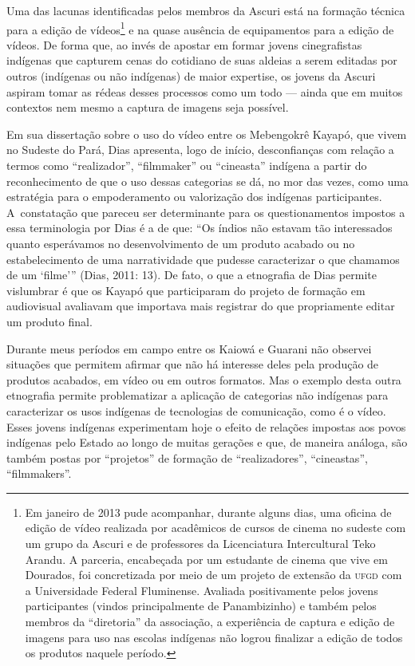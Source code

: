 Uma das lacunas identificadas pelos membros da Ascuri está na formação
técnica para a edição de vídeos\footnote[12]{Em janeiro de 2013 pude
acompanhar, durante alguns dias, uma oficina de edição de vídeo
realizada por acadêmicos de cursos de cinema no sudeste com um grupo da
Ascuri e de professores da Licenciatura Intercultural Teko Arandu. A
parceria, encabeçada por um estudante de cinema que vive em Dourados,
foi concretizada por meio de um projeto de extensão da \textsc{ufgd} com a
Universidade Federal Fluminense. Avaliada positivamente pelos jovens
participantes (vindos principalmente de Panambizinho) e também pelos
membros da ``diretoria'' da associação, a experiência de captura e edição
de imagens para uso nas escolas indígenas não logrou finalizar a edição
de todos os produtos naquele período. } e na quase ausência de
equipamentos para a edição de vídeos. De forma que, ao invés de apostar
em formar jovens cinegrafistas indígenas que capturem cenas do
cotidiano de suas aldeias a serem editadas por outros (indígenas ou não
indígenas) de maior expertise, os jovens da Ascuri aspiram tomar as
rédeas desses processos como um todo --- ainda que em muitos contextos
nem mesmo a captura de imagens seja possível.

Em sua dissertação sobre o uso do vídeo entre os Mebengokrê Kayapó, que
vivem no Sudeste do Pará, Dias apresenta, logo de início, desconfianças
com relação a termos como ``realizador'', ``filmmaker'' ou ``cineasta''
indígena a partir do reconhecimento de que o uso dessas categorias se
dá, no mor das vezes, como uma estratégia para o empoderamento ou
valorização dos indígenas participantes. A~constatação que pareceu ser
determinante para os questionamentos impostos a essa terminologia por
Dias é a de que: ``Os índios não estavam tão interessados quanto
esperávamos no desenvolvimento de um produto acabado ou no
estabelecimento de uma narratividade que pudesse caracterizar o que
chamamos de um ‘filme’'' (Dias, 2011: 13). De fato, o que a etnografia
de Dias permite vislumbrar é que os Kayapó que participaram do projeto
de formação em audiovisual avaliavam que importava mais registrar do
que propriamente editar um produto final.

Durante meus períodos em campo entre os Kaiowá e Guarani não observei
situações que permitem afirmar que não há interesse deles pela produção
de produtos acabados, em vídeo ou em outros formatos. Mas o exemplo
desta outra etnografia permite problematizar a aplicação de categorias
não indígenas para caracterizar os usos indígenas de tecnologias de
comunicação, como é o vídeo. Esses jovens indígenas experimentam hoje o
efeito de relações impostas aos povos indígenas pelo Estado ao longo de
muitas gerações e que, de maneira análoga, são também postas por
``projetos'' de formação de ``realizadores'', ``cineastas'', ``filmmakers''.

